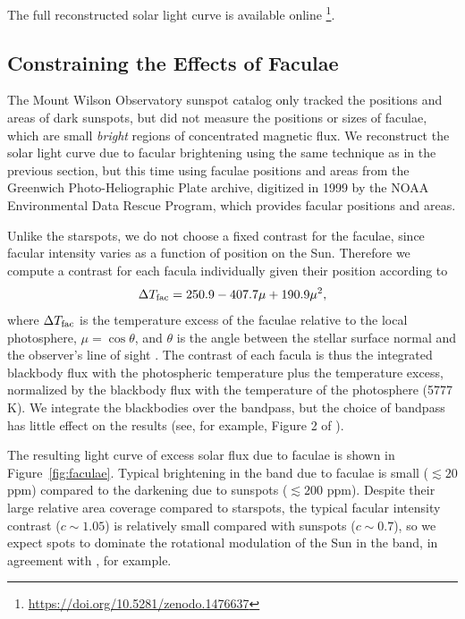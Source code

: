 The full reconstructed solar light curve is available online \citep{solarlightcurve}\footnote{\url{https://doi.org/10.5281/zenodo.1476637}}. 

\subsection{Constraining the Effects of Faculae}

The Mount Wilson Observatory sunspot catalog only tracked the positions and areas of dark sunspots, but did not measure the positions or sizes of faculae, which are small \textit{bright} regions of concentrated magnetic flux. We reconstruct the solar light curve due to facular brightening using the same technique as in the previous section, but this time using faculae positions and areas from the Greenwich Photo-Heliographic Plate archive, digitized in 1999 by the NOAA Environmental Data Rescue Program, which provides facular positions and areas.

Unlike the starspots, we do not choose a fixed contrast for the faculae, since facular intensity varies as a function of position on the Sun. Therefore we compute a contrast for each facula individually given their position according to
\begin{equation}
\Delta T_{\rm fac} = 250.9 - 407.7 \mu + 190.9 \mu^2,
\end{equation}
where $\Delta T_{\rm fac}$ is the temperature excess of the faculae relative to the local photosphere, $\mu = \cos \theta$, and $\theta$ is the angle between the stellar surface normal and the observer's line of sight \citep{Meunier2010,Dumusque2014}. The contrast of each facula is thus the integrated blackbody flux with the photospheric temperature plus the temperature excess, normalized by the blackbody flux with the temperature of the photosphere (5777 K). We integrate the blackbodies over the \kepler bandpass, but the choice of bandpass has little effect on the results (see, for example, Figure 2 of \citealt{Morris2018b}).

The resulting light curve of excess solar flux due to faculae is shown in Figure~\ref{fig:faculae}.  Typical brightening in the \kepler band due to faculae is small ($\lesssim 20$ ppm) compared to the darkening due to sunspots ($\lesssim 200$ ppm). Despite their large relative area coverage compared to starspots, the typical facular intensity contrast ($c \sim 1.05$) is relatively small compared with sunspots ($c \sim 0.7$), so we expect spots to dominate the rotational modulation of the Sun in the \kepler band, in agreement with \citet{Shapiro2016}, for example. 

